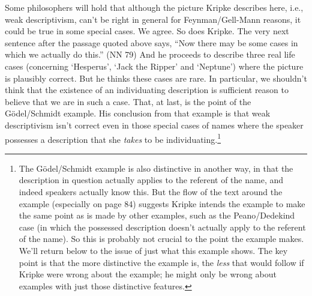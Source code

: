 \documentclass[
  10pt,
  letterpaper,
  DIV=11,
  numbers=noendperiod,
  twoside]{scrartcl}
\begin{document}
Some philosophers will hold that although the picture Kripke describes
here, i.e., weak descriptivism, can't be right in general for
Feynman/Gell-Mann reasons, it could be true in some special cases. We
agree. So does Kripke. The very next sentence after the passage quoted
above says, ``Now there may be some cases in which we actually do
this.'' (NN 79) And he proceeds to describe three real life cases
(concerning `Hesperus', `Jack the Ripper' and `Neptune') where the
picture is plausibly correct. But he thinks these cases are rare. In
particular, we shouldn't think that the existence of an individuating
description is sufficient reason to believe that we are in such a case.
That, at last, is the point of the Gödel/Schmidt example. His conclusion
from that example is that weak descriptivism isn't correct even in those
special cases of names where the speaker possesses a description that
she \emph{takes} to be individuating.\footnote{The Gödel/Schmidt example
  is also distinctive in another way, in that the description in
  question actually applies to the referent of the name, and indeed
  speakers actually know this. But the flow of the text around the
  example (especially on page 84) suggests Kripke intends the example to
  make the same point as is made by other examples, such as the
  Peano/Dedekind case (in which the possessed description doesn't
  actually apply to the referent of the name). So this is probably not
  crucial to the point the example makes. We'll return below to the
  issue of just what this example shows. The key point is that the more
  distinctive the example is, the \emph{less} that would follow if
  Kripke were wrong about the example; he might only be wrong about
  examples with just those distinctive features.}
\end{document}
